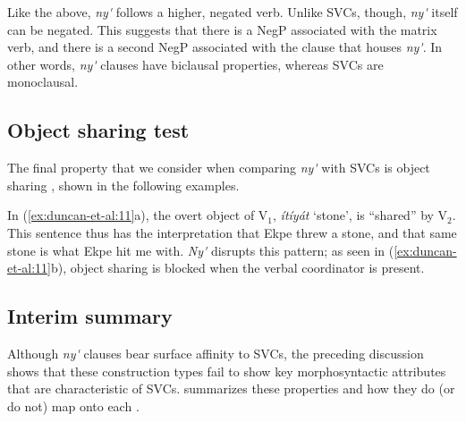 \documentclass[output=paper,modfonts,nonflat,
colorlinks, citecolor=brown,
draftmode
]{langsci/langscibook}
\begin{document}
\noindent Like the  above, \textit{ny\'{\textturnv}\ng} follows a higher, negated verb. Unlike SVCs, though, \textit{ny\'{\textturnv}\ng} itself can be negated. This suggests that there is a NegP associated with the matrix verb, and there is a second NegP associated with the clause that houses \textit{ny\'{\textturnv}\ng}. In other words, \textit{ny\'{\textturnv}\ng} clauses have biclausal properties, whereas SVCs are monoclausal.

\subsection{Object sharing test}\label{sec:duncan-et-al:2.4}

The final property that we consider when comparing \textit{ny\'{\textturnv}\ng} with SVCs is object sharing \citep{baker1989object}, shown in the following examples.

\ea\label{ex:duncan-et-al:11}
\z
\z

\noindent In (\ref{ex:duncan-et-al:11}a), the overt object of V$_1$, \textit{ítíyát} `stone', is ``shared'' by V$_2$. This sentence thus has the interpretation that Ekpe threw a stone, and that same stone is what Ekpe hit me with. \textit{Ny\'{\textturnv}\ng} disrupts this pattern; as seen in (\ref{ex:duncan-et-al:11}b), object sharing is blocked when the verbal coordinator is present.

\subsection{Interim summary}\label{sec:duncan-et-al:2.5}

Although \textit{ny\'{\textturnv}\ng} clauses bear surface affinity to SVCs, the preceding discussion shows that these construction types fail to show key morphosyntactic attributes that are characteristic of SVCs.  summarizes these properties and how they do (or do not) map onto each .
\end{document}
